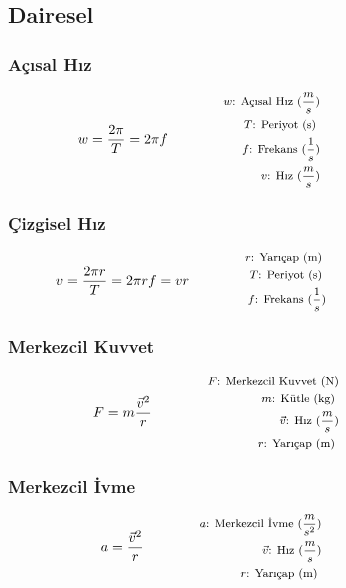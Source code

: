 \subsection{Dairesel}

\subsubsection*{Açısal Hız}
\begin{equation}
    w  = \frac{2\pi}{T} = 2 \pi f \qquad \qquad \parbox{5.5cm}{\footnotesize$\begin{aligned}
        w\text{: Açısal Hız } (\frac{m}{s}) \\
        T\text{: Periyot (s) } \\
        f\text{: Frekans } (\frac{1}{s})  \\
        v\text{: Hız } (\frac{m}{s})
\end{aligned}$}
\end{equation}

\subsubsection*{Çizgisel Hız}
\begin{equation}
    v = \frac{2 \pi r}{T} = 2 \pi r f = v r  \qquad \qquad \parbox{5.5cm}{\footnotesize$\begin{aligned}
        r\text{: Yarıçap (m) } \\
        T\text{: Periyot (s) } \\
        f\text{: Frekans } (\frac{1}{s})
\end{aligned}$}
\end{equation}

\subsubsection*{Merkezcil Kuvvet}
\begin{equation}
    F = m \frac{\vec{v}^2}{r} \qquad \qquad \parbox{5.5cm}{\footnotesize$\begin{aligned}
        F\text{: Merkezcil Kuvvet (N)} \\
        m\text{: Kütle (kg) } \\
        \vec{v}\text{: Hız } (\frac{m}{s}) \\
        r\text{: Yarıçap (m) }
\end{aligned}$}
\end{equation}

\subsubsection{Merkezcil İvme}
\begin{equation}
    a = \frac{\vec{v}^2}{r} \qquad \qquad \parbox{5.5cm}{\footnotesize$\begin{aligned}
        a\text{: Merkezcil İvme } (\frac{m}{s^2}) \\
        \vec{v}\text{: Hız } (\frac{m}{s}) \\
        r\text{: Yarıçap (m) }
\end{aligned}$}
\end{equation}
